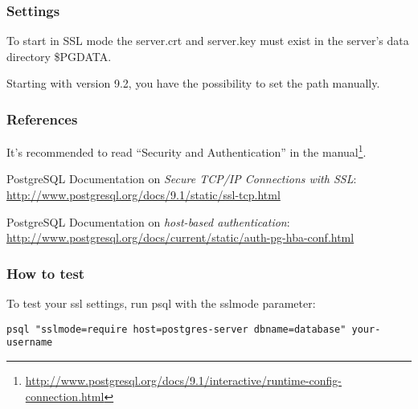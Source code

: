 \subsubsection{Settings}

To start in SSL mode the server.crt and server.key must exist in the server's data directory \$PGDATA.

Starting with version 9.2, you have the possibility to set the path manually.



\subsubsection{References}
\begin{itemize*}
  \item It's recommended to read ``Security and Authentication'' in the manual\footnote{\url{http://www.postgresql.org/docs/9.1/interactive/runtime-config-connection.html}}.
  \item PostgreSQL Documentation on \emph{Secure TCP/IP Connections with SSL}: \url{http://www.postgresql.org/docs/9.1/static/ssl-tcp.html}
  \item PostgreSQL Documentation on \emph{host-based authentication}: \url{http://www.postgresql.org/docs/current/static/auth-pg-hba-conf.html}
\end{itemize*}


\subsubsection{How to test}
To test your ssl settings, run psql with the sslmode parameter:
\begin{lstlisting}
psql "sslmode=require host=postgres-server dbname=database" your-username
\end{lstlisting}

